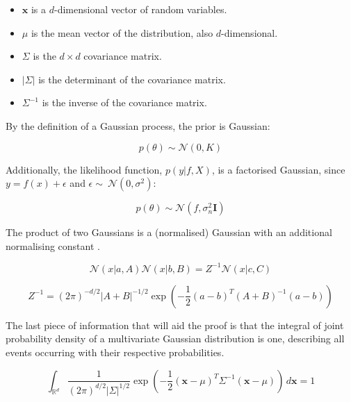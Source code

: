 \documentclass[12pt,a4paper]{article}
\begin{document}
\begin{itemize}
    \item \( \mathbf{x} \) is a \( d \)-dimensional vector of random variables.
    \item \( \mu \) is the mean vector of the distribution, also \( d \)-dimensional.
    \item \( \Sigma \) is the \( d \times d \) covariance matrix.
    \item \( |\Sigma| \) is the determinant of the covariance matrix.
    \item \( \Sigma^{-1} \) is the inverse of the covariance matrix.
\end{itemize}

By the definition of a Gaussian process, the prior is Gaussian: 

\begin{equation}
p(\theta) \sim \mathcal{N}(0, K) 
\label{eq:prior}    
\end{equation} 

Additionally, the likelihood function, \(p(y | f, X)\), is a factorised Gaussian, since  \(y = f(x) + \epsilon\) and \(\epsilon \sim \ \mathcal{N}(0, \sigma^2)\):

\begin{equation}
p(\theta) \sim \mathcal{N}(f, \sigma_n^2 \mathbf{I})
\label{eq:factorised gaussian prior}
\end{equation}

The product of two Gaussians is a (normalised) Gaussian with an additional normalising constant \citep[see A.7]{williams2006gaussian}.

\begin{equation}
\mathcal{N}(x | a, A) \mathcal{N}(x | b, B) = Z^{-1} \mathcal{N}(x | c, C)
\label{eq:product of two gaussians}
\end{equation}

\begin{equation}
Z^{-1} = (2\pi)^{-d/2} |A + B|^{-1/2} \exp\left( -\frac{1}{2} (a - b)^T (A+B)^{-1} (a - b) \right)
\label{eq:normalising constant}
\end{equation}

The last piece of information that will aid the proof is that the integral of joint probability density of a multivariate Gaussian distribution is one, describing all events occurring with their respective probabilities.

\begin{equation}
\int_{\mathbb{R}^d} \frac{1}{(2\pi)^{d/2} |\Sigma|^{1/2}} \exp\left( -\frac{1}{2} (\mathbf{x} - \mu)^T \Sigma^{-1} (\mathbf{x} - \mu) \right) \, d\mathbf{x} = 1
\label{eq:integral of pdf equal to one}
\end{equation}
\end{document}
